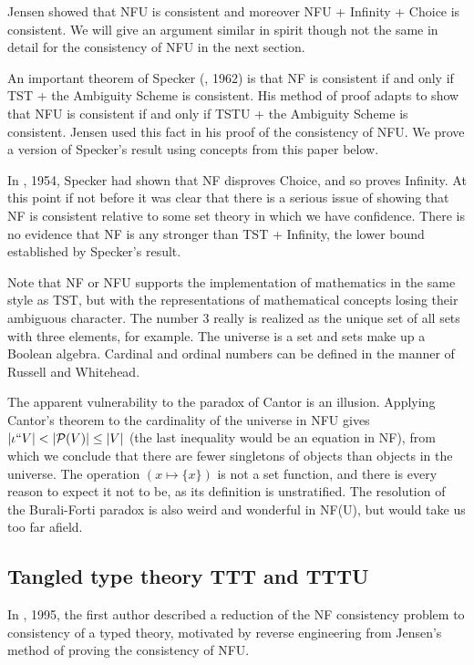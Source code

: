 \documentclass{article}
\theoremstyle{definition}
\theoremstyle{remark}
\begin{document}
Jensen showed that NFU is consistent and moreover NFU + Infinity + Choice is consistent.  We will give an argument similar in spirit though not the same in detail for the consistency of NFU in the next section.

An important theorem of Specker (\cite{ambiguity}, 1962) is that NF is consistent if and only if TST + the Ambiguity Scheme is consistent.  His method of proof adapts to show that  NFU is consistent if and only if TSTU + the Ambiguity Scheme is consistent.  Jensen used this fact in his proof of the consistency of NFU.  We prove a version of Specker's result using concepts from this paper below.

In \cite{notac}, 1954, Specker had shown that NF disproves Choice, and so proves Infinity.  At this point if not before it was clear that there is a serious issue of showing that NF is consistent relative to some set theory in which we have confidence.  There is no evidence that NF is any stronger than TST + Infinity, the lower bound established by Specker's result.

Note that NF or NFU supports the implementation of mathematics in the same style as TST, but with the representations of mathematical concepts losing their ambiguous character.  The number 3 really is realized as the unique set of all sets with three elements, for example.  The universe is a set and sets make up a Boolean algebra.   Cardinal and ordinal numbers can be defined
in the manner of Russell and Whitehead.

The apparent vulnerability to the paradox of Cantor is an illusion.  Applying Cantor's theorem to the cardinality of the universe in NFU gives $|\iota``V| < |{\cal P}(V)| \leq |V|$ (the last inequality would be an equation in NF), from which we conclude that there are fewer singletons of objects than objects in the universe.  The operation $(x \mapsto \{x\})$ is not a set function, and there is every reason to expect it not to be, as its definition is unstratified.  The resolution of the Burali-Forti paradox is also weird and wonderful in NF(U), but would take us too far afield.

\newpage

\subsection{Tangled type theory TTT and TTTU}

In \cite{tangled}, 1995, the first author described a reduction of the NF consistency problem to consistency of a typed theory,  motivated by reverse engineering from Jensen's method of proving the consistency of NFU.
\end{document}
